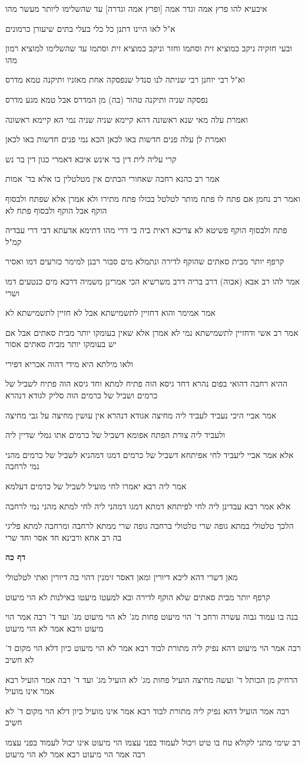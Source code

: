 \documentclass[12pt, openany]{book}
\newcommand{\sethebfont}{
\fontsize{10.5pt}{21.0pt} \selectfont
}
\newcommand{\textblock}[1]{
{\sethebfont #1\\}	
}
\newcommand{\sectname}{}
\newcommand{\newsection}[1]{
	\addcontentsline{toc}{section}{#1}
	\renewcommand{\sectname}{#1}	
	\vspace{-\baselineskip}
	\begin{center}
		\textbf{%
\fontsize{16pt}{16pt}\selectfont
			#1}
	\end{center}
	\vspace{-\baselineskip}
	\nopagebreak
}
\begin{document}
\textblock{איבעיא להו פרץ אמה וגדר אמה [ופרץ אמה וגדרה] עד שהשלימו ליותר מעשר מהו }
\textblock{א"ל לאו היינו דתנן כל כלי בעלי בתים שיעורן כרמונים}
\textblock{ובעי חזקיה ניקב כמוציא זית וסתמו וחזר וניקב כמוציא זית וסתמו עד שהשלימו למוציא רמון מהו}
\textblock{וא"ל רבי יוחנן רבי שניתה לנו סנדל שנפסקה אחת מאזניו ותיקנה טמא מדרס}
\textblock{נפסקה שניה ותיקנה טהור (בה) מן המדרס אבל טמא מגע מדרס}
\textblock{ואמרת עלה מאי שנא ראשונה דהא קיימא שניה שניה נמי הא קיימא ראשונה}
\textblock{ואמרת לן עלה פנים חדשות באו לכאן הכא נמי פנים חדשות באו לכאן}
\textblock{קרי עליה לית דין בר אינש איכא דאמרי כגון דין בר נש}
\textblock{אמר רב כהנא רחבה שאחורי הבתים אין מטלטלין בו אלא בד' אמות}
\textblock{ואמר רב נחמן אם פתח לו פתח מותר לטלטל בכולו פתח מתירו ולא אמרן אלא שפתח ולבסוף הוקף אבל הוקף ולבסוף פתח לא}
\textblock{פתח ולבסוף הוקף פשיטא לא צריכא דאית ביה בי דרי מהו דתימא אדעתא דבי דרי עבדיה קמ"ל}
\textblock{קרפף יותר מבית סאתים שהוקף לדירה ונתמלא מים סבור רבנן למימר כזרעים דמו ואסיר}
\textblock{אמר להו רב אבא (אבוה) דרב בריה דרב משרשיא הכי אמרינן משמיה דרבא מים כנטעים דמו ושרי}
\textblock{אמר אמימר והוא דחזיין לתשמישתא אבל לא חזיין לתשמישתא לא}
\textblock{אמר רב אשי ודחזיין לתשמישתא נמי לא אמרן אלא שאין בעומקו יותר מבית סאתים אבל אם יש בעומקו יותר מבית סאתים אסור}
\textblock{ולאו מילתא היא מידי דהוה אכריא דפירי}
\textblock{ההיא רחבה דהואי בפום נהרא דחד גיסא הוה פתיח למתא וחד גיסא הוה פתיח לשביל של כרמים ושביל של כרמים הוה סליק לגודא דנהרא}
\textblock{אמר אביי היכי נעביד לעביד ליה מחיצה אגודא דנהרא אין עושין מחיצה על גבי מחיצה}
\textblock{ולעביד ליה צורת הפתח אפומא דשביל של כרמים אתו גמלי שדיין ליה}
\textblock{אלא אמר אביי ליעביד לחי אפיתחא דשביל של כרמים דמגו דמהניא לשביל של כרמים מהני נמי לרחבה}
\textblock{אמר ליה רבא יאמרו לחי מועיל לשביל של כרמים דעלמא}
\textblock{אלא אמר רבא עבדינן ליה לחי לפיתחא דמתא דמגו דמהני ליה לחי למתא מהני נמי לרחבה}
\textblock{הלכך טלטולי במתא גופה שרי טלטולי ברחבה גופה שרי ממתא לרחבה ומרחבה למתא פליגי בה רב אחא ורבינא חד אסר וחד שרי}
\newsection{דף כה}
\textblock{מאן דשרי דהא ליכא דיורין ומאן דאסר זימנין דהוי בה דיורין ואתי לטלטולי}
\textblock{קרפף יותר מבית סאתים שלא הוקף לדירה ובא למעטו מיעטו באילנות לא הוי מיעוט}
\textblock{בנה בו עמוד גבוה עשרה ורחב ד' הוי מיעוט פחות מג' לא הוי מיעוט מג' ועד ד' רבה אמר הוי מיעוט ורבא אמר לא הוי מיעוט}
\textblock{רבה אמר הוי מיעוט דהא נפיק ליה מתורת לבוד רבא אמר לא הוי מיעוט כיון דלא הוי מקום ד' לא חשיב}
\textblock{הרחיק מן הכותל ד' ועשה מחיצה הועיל פחות מג' לא הועיל מג' ועד ד' רבה אמר הועיל רבא אמר אינו מועיל}
\textblock{רבה אמר הועיל דהא נפיק ליה מתורת לבוד רבא אמר אינו מועיל כיון דלא הוי מקום ד' לא חשיב}
\textblock{רב שימי מתני לקולא טח בו טיט ויכול לעמוד בפני עצמו הוי מיעוט אינו יכול לעמוד בפני עצמו רבה אמר הוי מיעוט רבא אמר לא הוי מיעוט}
\end{document}
